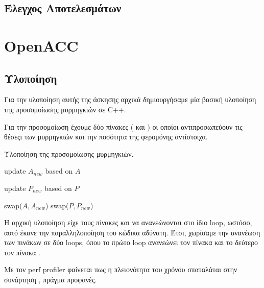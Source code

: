\documentclass[11pt]{scrartcl} %
\begin{document}
\subsection{Έλεγχος Αποτελεσμάτων}

\section{OpenACC}

\subsection{Υλοποίηση}

Για την υλοποίηση αυτής της άσκησης αρχικά δημιουργήσαμε μία 
βασική υλοποίηση της προσομοίωσης μυρμηγκιών σε C++.

Για την προσομοίωση έχουμε δύο πίνακες ( και ) οι οποίοι αντιπροσωπεύουν 
τις θέσεςι των μυρμηγκιών και την ποσότητα της φερομόνης αντίστοιχα. 

\begin{algorithm}[H]
\caption{Υλοποίηση της προσομοίωσης μυρμηγκιών.}
\label{alg:serial}
\begin{algorithmic}[1]
    \State update $A_{new}$ based on $A$
\EndFor
\EndFor

    \State update $P_{new}$ based on $P$
\EndFor
\EndFor

    \State swap($A, A_{new}$)
    \State swap($P, P_{new}$)
\EndProcedure
\end{algorithmic}
\end{algorithm}

Η αρχική υλοποίηση είχε τους πίνακες  και  να ανανεώνονται στο ίδιο loop,
ωστόσο, αυτό έκανε την παραλληλοποίηση του κώδικα αδύνατη. Έτσι, 
χωρίσαμε την ανανέωση των πινάκων σε δύο loops, όπου το πρώτο loop ανανεώνει τον πίνακα  και το δεύτερο τον πίνακα .

Με τον perf profiler φαίνεται πως η πλειονότητα του χρόνου σπαταλάται στην συνάρτηση ,
πράγμα προφανές.


\end{document}
